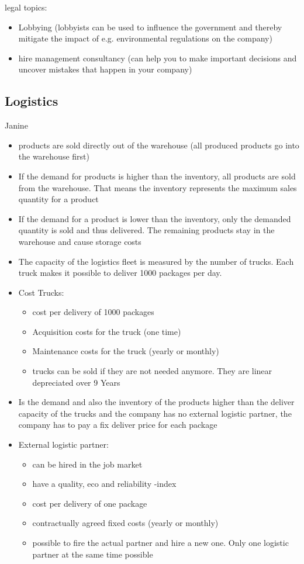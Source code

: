 \documentclass[11pt,titlepage,oneside,openany]{book}
\begin{document}
legal topics: 
\begin{itemize} 
\item Lobbying (lobbyists can be used to influence the government and thereby mitigate the impact of e.g. environmental regulations on the company)
\item hire management consultancy (can help you to make important decisions and uncover mistakes that happen in your company) 
\end{itemize}

\subsection{Logistics}
Janine
\begin{itemize} 
\item products are sold directly out of the warehouse (all produced products go into the warehouse first) 
\item If the demand for products is higher than the inventory, all products are sold from the warehouse. That means the inventory represents the maximum sales quantity for a product
\item If the demand for a product is lower than the inventory, only the demanded quantity is sold and thus delivered. The remaining products stay in the warehouse and cause storage costs
\item The capacity of the logistics fleet is measured by the number of trucks. Each truck makes it possible to deliver 1000 packages per day.
\item Cost Trucks:
\begin{itemize}
\item cost per delivery of 1000 packages
\item Acquisition costs for the truck (one time)
\item Maintenance costs for the truck (yearly or monthly)
\item trucks can be sold if they are not needed anymore. They are linear depreciated over 9 Years  
\end{itemize}
\item Is the demand and also the inventory of the products higher than the deliver capacity of the trucks and the company has no external logistic partner, the company has to pay a fix deliver price for each package
\item External logistic partner:
\begin{itemize}
    \item can be hired in the job market
    \item have a quality, eco and reliability -index
    \item cost per delivery of one package
    \item contractually agreed fixed costs (yearly or monthly) 
    \item possible to fire the actual partner and hire a new one. Only one logistic partner at the same time possible 
\end{itemize}
\end{itemize}
\end{document}
